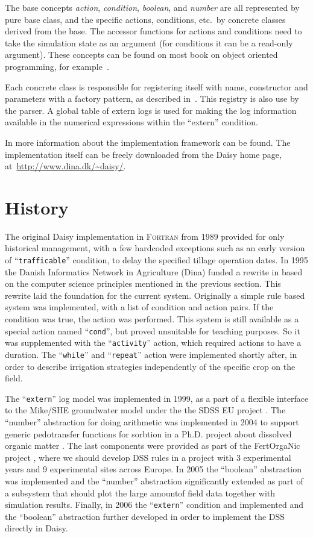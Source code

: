 \documentclass[a4paper]{article}
\newcommand{\dname}[1]{``\texttt{#1}''}
\begin{document}
The base concepts \emph{action}, \emph{condition}, \emph{boolean}, and
\emph{number} are all represented by pure base class, and the specific
actions, conditions, etc.\ by concrete classes derived from the base.
The accessor functions for actions and conditions need to take the
simulation state as an argument (for conditions it can be a read-only
argument).  These concepts can be found on most book on object
oriented programming, for example~\cite{tcpppl}.

Each concrete class is responsible for registering itself with name,
constructor and parameters with a factory pattern, as described
in~\cite{patterns}.  This registry is also use by the parser.  A
global table of extern logs is used for making the log information
available in the numerical expressions within the ``extern''
condition.

In \cite{daisy-ems} more information about the implementation
framework can be found.  The implementation itself can be freely
downloaded from the Daisy home page, at~\url{http://www.dina.dk/~daisy/}.

\section{History}

The original Daisy implementation in \textsc{Fortran} from 1989
provided for only historical management, with a few hardcoded
exceptions such as an early version of \dname{trafficable} condition,
to delay the specified tillage operation dates.  In 1995 the Danish
Informatics Network in Agriculture (Dina) funded a rewrite in
\cplusplus{} based on the computer science principles mentioned in the
previous section.  This rewrite laid the foundation for the current
system.  Originally a simple rule based system was implemented, with a
list of condition and action pairs.  If the condition was true, the
action was performed.  This system is still available as a special
action named \dname{cond}, but proved unsuitable for teaching
purposes.  So it was supplemented with the \dname{activity} action,
which required actions to have a duration.  The \dname{while} and
\dname{repeat} action were implemented shortly after, in order to
describe irrigation strategies independently of the specific crop on the
field.

The \dname{extern} log model was implemented in 1999, as a part of a
flexible interface to the Mike/SHE groundwater model \cite{mikeshe}
under the the SDSS EU project \cite{sdss}.  The ``number'' abstraction
for doing arithmetic was implemented in 2004 to support generic
pedotransfer functions for sorbtion in a Ph.D. project about dissolved
organic matter \cite{bgj-dom}.  The last components were provided as
part of the FertOrgaNic project \cite{fertorganic}, where we should
develop DSS rules in a project with 3 experimental years and 9
experimental sites across Europe.  In 2005 the ``boolean'' abstraction
was implemented and the ``number'' abstraction significantly extended
as part of a subsystem that should plot the large amountof field data
together with simulation results.  Finally, in 2006 the \dname{extern}
condition and implemented and the ``boolean'' abstraction further
developed in order to implement the DSS directly in Daisy.
\end{document}

